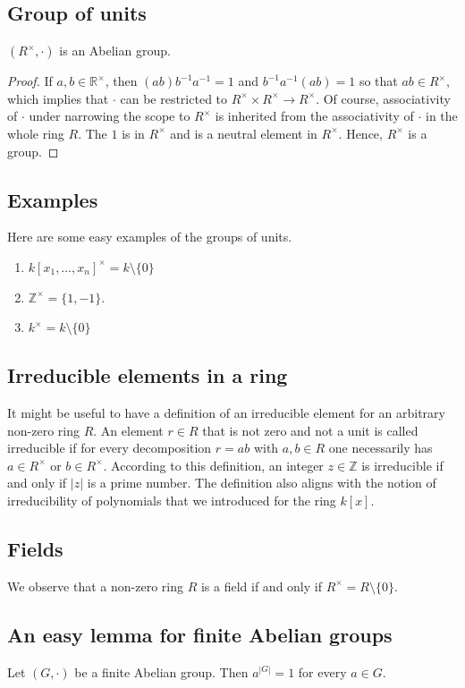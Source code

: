 \documentclass[11pt,a4paper]{amsart}
\newcommand{\Z}{{\mathbb{Z}}}
\newcommand{\R}{{\mathbb{R}}}
\begin{document}
\subsection{Group of units} $(R^\times, \cdot )$ is an Abelian group. 

\begin{proof} 
	If $a, b \in \R^\times$, then $(ab) b^{-1} a^{-1} = 1$ and $b^{-1} a^{-1} (ab) = 1$ so that $ab \in R^\times$, which implies that $\cdot$ can be restricted to $R^\times \times R^\times \to R^\times$. Of course, associativity of $\cdot$ under narrowing the scope to $R^\times$ is inherited from the associativity of $\cdot$ in the whole ring $R$. The $1$ is in $R^\times$ and is a neutral element in $R^\times$. Hence, $R^\times$ is a group. 
\end{proof} 

\subsection{Examples} Here are some easy examples of the groups of units.
\begin{enumerate} 
	\item $k[x_1,\ldots,x_n]^\times = k \setminus \{0\}$
	\item $\Z^\times = \{1,-1\}$. 
	\item $k^\times = k \setminus \{0\}$
\end{enumerate} 

\subsection{Irreducible elements in a ring} It might be useful to have a definition of an irreducible element for an arbitrary non-zero ring $R$.  An element $r \in R$ that is not zero and not a unit is called irreducible if for every decomposition $r = ab$ with $a,b \in R$ one necessarily has $a \in R^\times$ or $b \in R^\times$. According to this definition, an integer $z \in \Z$ is irreducible if and only if $|z|$ is a prime number. The definition also aligns with the notion of irreducibility of polynomials that we introduced for the ring $k[x]$. 

\subsection{Fields} We observe that a non-zero ring $R$ is a field if and only if $R^\times = R \setminus \{0\}$. 

\subsection{An easy lemma for finite Abelian groups} Let $(G, \cdot)$ be a finite Abelian group. Then $a^{|G|} =1$ for every $a \in G$. 
\end{document}
